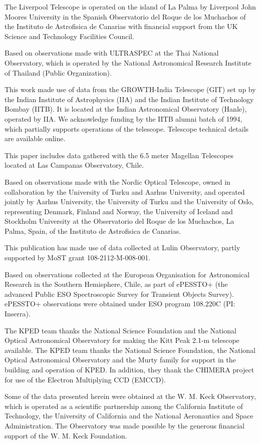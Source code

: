 \documentclass{nature_plusfigure}
\begin{document}
\begin{addendum}
The Liverpool Telescope is operated on the island of La Palma by Liverpool John Moores University in the Spanish Observatorio del Roque de los Muchachos of the Instituto de Astrofisica de Canarias with financial support from the UK Science and Technology Facilities Council.

Based on observations made with ULTRASPEC at the Thai National Observatory, which is operated by the National Astronomical Research Institute of Thailand (Public Organization).

This work made use of data from the GROWTH-India Telescope (GIT) set up by the Indian Institute of Astrophysics (IIA) and the Indian Institute of Technology Bombay (IITB). It is located at the Indian Astronomical Observatory (Hanle), operated by IIA. We acknowledge funding by the IITB alumni batch of 1994, which partially supports operations of the telescope. Telescope technical details are available online.\cite{growth_india}

This paper includes data gathered with the 6.5 meter Magellan Telescopes located at Las Campanas Observatory, Chile.

Based on observations made with the Nordic Optical Telescope, owned in collaboration by the University of Turku and Aarhus University, and operated jointly by Aarhus University, the University of Turku and the University of Oslo, representing Denmark, Finland and Norway, the University of Iceland and Stockholm University at the Observatorio del Roque de los Muchachos, La Palma, Spain, of the Instituto de Astrofisica de Canarias.

This publication has made use of data collected at Lulin Observatory, partly supported by MoST grant 108-2112-M-008-001.

Based on observations collected at the European Organisation for Astronomical Research in the Southern Hemisphere, Chile, as part of ePESSTO+ (the advanced Public ESO Spectroscopic Survey for Transient Objects Survey).
ePESSTO+ observations were obtained under ESO program 108.220C (PI: Inserra).

The KPED team thanks the National Science Foundation and the National Optical Astronomical Observatory for making the Kitt Peak 2.1-m telescope available. The KPED team thanks the National Science Foundation, the National Optical Astronomical Observatory and the Murty family for support in the building and operation of KPED. In addition, they thank the CHIMERA project for use of the Electron Multiplying CCD (EMCCD).

Some of the data presented herein were obtained at the W. M. Keck Observatory, which is operated as a scientific partnership among the California Institute of Technology, the University of California and the National Aeronautics and Space Administration. The Observatory was made possible by the generous financial support of the W. M. Keck Foundation.


\end{addendum}
\end{document}
